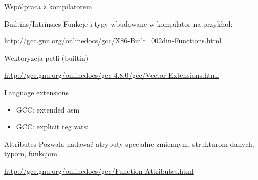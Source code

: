 \begin{frame}{Współpraca z kompilatorem}
	\begin{block}{Builtins/Intrinsics}
		Funkcje i typy wbudowane w kompilator na przykład:
		\begin{itemize}
			\item \verb*%__builtin_expects({G_LIKELY,G_UNLIKELY})%
			\item \verb*%__builtin_cpu_supports("sse2")%
			\item \verb*%__m64 avariable%
		\end{itemize}
		\url{http://gcc.gnu.org/onlinedocs/gcc/X86-Built_002din-Functions.html}
	\end{block}
	\begin{block}{Wektoryzcja pętli (builtin)}
		\begin{itemize}
			\item \verb*%__m64 _mm_add_pi16%
			\item \verb*%__m64 _mm_mullo_pi16%
			\item \verb*%__m64 _mm_min_ps%
		\end{itemize}
		\url{http://gcc.gnu.org/onlinedocs/gcc-4.8.0/gcc/Vector-Extensions.html}
	\end{block}
	\begin{block}{Language extensions}
		\begin{itemize}
			\item GCC: extended asm
			\item GCC: explicit reg vars:
		\end{itemize}
	\end{block}
	\begin{block}{Attributes}
		Pozwala nadawać atrybuty specjalne zmiennym, strukturom danych, typom, funkcjom.
		\begin{itemize}
			\item \verb*%int x __attribute__((aligned(16)))=0;% //zmienna
			\item \verb*%int x[2] __attribute__ ((packed));% //jako czesc struktury %
			\item \verb*%typedef int more_aligned_int %
			\verb*%__attribute__ ((aligned (8)));% //typ %
			\item \verb*%int old_fn () __attribute__ ((fastcall));% //funkcja
			\item \verb*%void fatal () __attribute__ ((noreturn));%
		\end{itemize}
		\url{http://gcc.gnu.org/onlinedocs/gcc/Function-Attributes.html}
	\end{block}
\end{frame}
